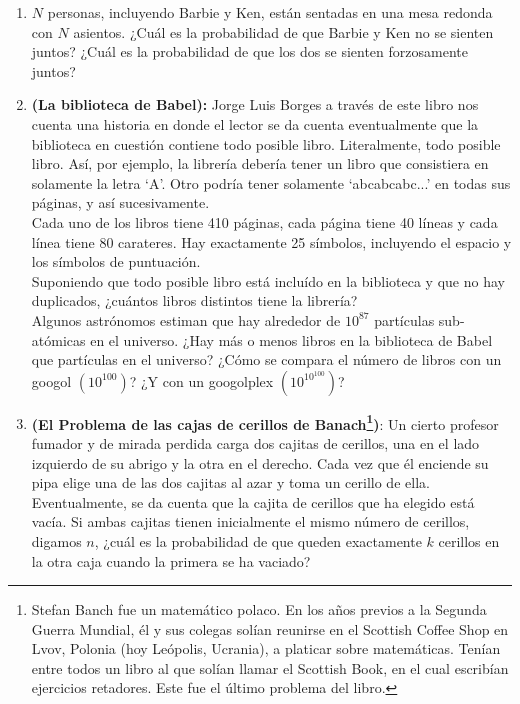 \documentclass{article}
\begin{document}
\begin{enumerate}
    
        \item $N$ personas, incluyendo Barbie y Ken, están sentadas en una mesa redonda con $N$ asientos. 
    ¿Cuál es la probabilidad de que Barbie y Ken no se sienten juntos? ¿Cuál es la probabilidad de que los dos 
    se sienten forzosamente juntos?
    \item \textbf{(La biblioteca de Babel):} Jorge Luis Borges a través de este libro nos cuenta una historia en donde 
    el lector se da cuenta eventualmente que la biblioteca en cuestión contiene todo posible libro. Literalmente, todo posible libro. 
    Así, por ejemplo, la librería debería tener un libro que consistiera en solamente la letra `A'. Otro podría 
    tener solamente `abcabcabc...' en todas sus páginas, y así sucesivamente.\\

    Cada uno de los libros tiene 410 páginas, cada página tiene 40 líneas y cada línea tiene 80 carateres. 
    Hay exactamente 25 símbolos, incluyendo el espacio y los símbolos de puntuación. \\

    Suponiendo que todo posible libro está incluído en la biblioteca y que no hay duplicados, ¿cuántos libros 
    distintos tiene la librería?\\

    Algunos astrónomos estiman que hay alrededor de $10^{87}$ partículas sub-atómicas en el universo.
    ¿Hay más o menos libros en la biblioteca de Babel que partículas en el universo? ¿Cómo se compara el número 
    de libros con un googol $\left(10^{100}\right)$? ¿Y con un googolplex $\left(10^{10^{100}}\right)$?

    \item \textbf{(El Problema de las cajas de cerillos de Banach\footnote[1]{Stefan Banch fue un matemático polaco. En los años previos a la Segunda 
    Guerra Mundial, él y sus colegas solían reunirse en el Scottish Coffee Shop en Lvov, Polonia (hoy Leópolis, Ucrania), a platicar sobre matemáticas.
    Tenían entre todos un libro al que solían llamar el Scottish Book, en el cual escribían ejercicios retadores. Este fue el último 
    problema del libro.})}: Un cierto profesor fumador y de mirada perdida 
    carga dos cajitas de cerillos, una en el lado izquierdo de su abrigo y la otra en el derecho. Cada vez 
    que él enciende su pipa elige una de las dos cajitas al azar y toma un cerillo de ella. Eventualmente, se 
    da cuenta que la cajita de cerillos que ha elegido está vacía. Si ambas cajitas tienen inicialmente el mismo número 
    de cerillos, digamos $n$, ¿cuál es la probabilidad de que queden exactamente $k$ cerillos en la otra caja 
    cuando la primera se ha vaciado?
   

\end{enumerate}
\end{document}
